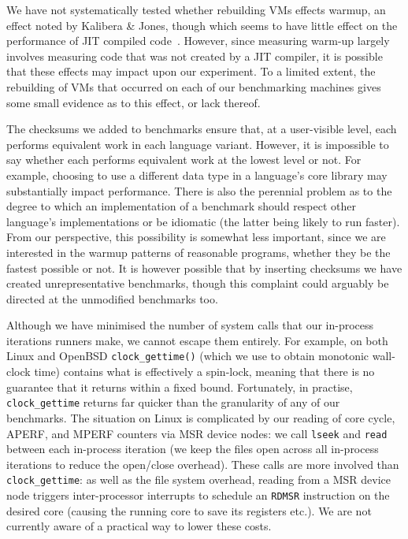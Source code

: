 \documentclass[acmlarge]{acmart}\settopmatter{printfolios=true}
\newcommand{\kalibera}{Kalibera \& Jones\xspace}
\begin{document}
We have not systematically tested whether rebuilding VMs effects warmup, an
effect noted by \kalibera, though which seems to have little effect on
the performance of JIT compiled code~\cite{barrett15approaches}. However, since measuring warm-up largely
involves measuring code that was not created by a JIT compiler, it is possible
that these effects may impact upon our experiment. To a limited extent, the
rebuilding of VMs that occurred on each of our benchmarking machines gives
some small evidence as to this effect, or lack thereof.

The checksums we added to benchmarks ensure that, at a user-visible level, each
performs equivalent work in each language variant. However, it is impossible to
say whether each performs equivalent work at the lowest level or not. For
example, choosing to use a different data type in a language's core library may
substantially impact performance. There is also the perennial problem as to the
degree to which an implementation of a benchmark should respect other
language's implementations or be idiomatic (the latter being likely to
run faster). From our perspective, this possibility is somewhat less important,
since we are interested in the warmup patterns of reasonable programs,
whether they be the fastest possible or not. It is however possible that by
inserting checksums we have created unrepresentative benchmarks, though
this complaint could arguably be directed at the unmodified benchmarks too.

Although we have minimised the number of system calls that our in-process
iterations runners make, we cannot escape them entirely. For example,
on both Linux and OpenBSD \texttt{clock\_gettime()} (which we use to obtain
monotonic wall-clock time) contains what is effectively a spin-lock,
meaning that there is no guarantee that it returns within a fixed bound.
Fortunately, in practise, \texttt{clock\_gettime} returns far quicker than the granularity
of any of our benchmarks. \label{aperf/mperf error} The situation
on Linux is complicated by our reading of core cycle, APERF, and MPERF
counters via MSR device nodes: we call \texttt{lseek} and \texttt{read}
between each in-process iteration (we keep the files open across all
in-process iterations to reduce the open/close overhead).
These calls are more involved than \texttt{clock\_gettime}:
as well as the file system overhead, reading from a MSR device
node triggers inter-processor interrupts to schedule an \texttt{RDMSR}
instruction on the desired core (causing the running core to save its registers etc.).
We are not currently aware of a practical way to lower these costs.
\end{document}
